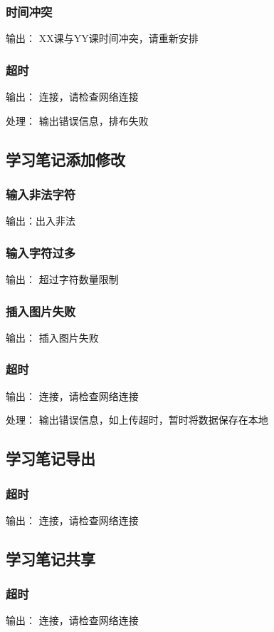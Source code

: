 \subsubsection{时间冲突}
输出： XX课与YY课时间冲突，请重新安排
\subsubsection{超时}
输出： 连接，请检查网络连接

处理： 输出错误信息，排布失败

\subsection{学习笔记添加修改}
\subsubsection{输入非法字符}
输出：出入非法
\subsubsection{输入字符过多}
输出： 超过字符数量限制
\subsubsection{插入图片失败}
输出： 插入图片失败
\subsubsection{超时}
输出： 连接，请检查网络连接

处理： 输出错误信息，如上传超时，暂时将数据保存在本地

\subsection{学习笔记导出}
\subsubsection{超时}
输出： 连接，请检查网络连接

\subsection{学习笔记共享}
\subsubsection{超时}
输出： 连接，请检查网络连接